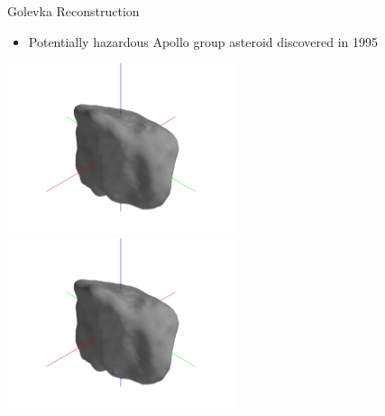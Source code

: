 \begin{frame}{Golevka Reconstruction}
    \begin{itemize}
        \item Potentially hazardous Apollo group asteroid discovered in 1995
    \end{itemize}
    \begin{center}
        \href{https://youtu.be/D5JJo1XfOeg}{\includegraphics[trim={20cm 10cm 20cm 10cm},clip,keepaspectratio,width=0.5\textwidth]{figures/computational_geometry/mesh_update/golevka/partial_5285.jpg}}%
        \href{https://youtu.be/OoaWECewMVI}{\includegraphics[trim={20cm 10cm 20cm 10cm},clip,keepaspectratio,width=0.5\textwidth]{figures/computational_geometry/mesh_update/golevka/partial_5285.jpg}}
\end{center}
\end{frame}

